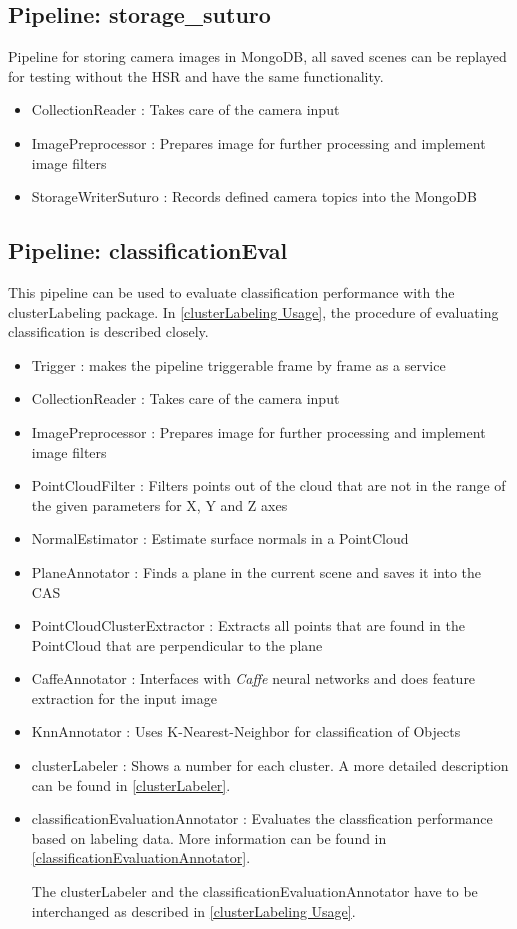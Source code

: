 \documentclass[main.tex]{subfiles}
\begin{document}
			\subsection{Pipeline: storage\_suturo} 
Pipeline for storing camera images in MongoDB, all saved scenes can be replayed for testing without the HSR and have the same functionality. 
\begin{itemize}
	\item CollectionReader : Takes care of the camera input
	\item ImagePreprocessor : Prepares image for further processing and implement image filters 
	\item StorageWriterSuturo :  Records defined camera topics into the MongoDB
\end{itemize}

\subsection{Pipeline: classificationEval}\label{Pipeline: classificationEval}
This pipeline can be used to evaluate classification performance with the clusterLabeling package. In \ref{clusterLabeling Usage}, the procedure of evaluating classification is described closely.

\begin{itemize}
	\item Trigger : makes the pipeline triggerable frame by frame as a service
  	\item CollectionReader : Takes care of the camera input
    \item ImagePreprocessor : Prepares image for further processing and implement image filters  
    \item PointCloudFilter : Filters points out of the cloud that are not in the range of the given parameters for X, Y and Z axes
    \item NormalEstimator : Estimate surface normals in a PointCloud 
    \item PlaneAnnotator : Finds a plane in the current scene and saves it into the CAS
  	\item PointCloudClusterExtractor :  Extracts all points that are found in the PointCloud that are perpendicular to the plane 
	\item CaffeAnnotator : Interfaces with \textit{Caffe} neural networks and does feature extraction for the input image
    \item KnnAnnotator : Uses K-Nearest-Neighbor for classification of Objects 
    \item clusterLabeler : Shows a number for each cluster. A more detailed description can be found in \ref{clusterLabeler}.
    \item classificationEvaluationAnnotator : Evaluates the classfication performance based on labeling data. More information can be found in \ref{classificationEvaluationAnnotator}.
    
    The clusterLabeler and the classificationEvaluationAnnotator have to be interchanged as described in \ref{clusterLabeling Usage}.
\end{itemize}
\end{document}
